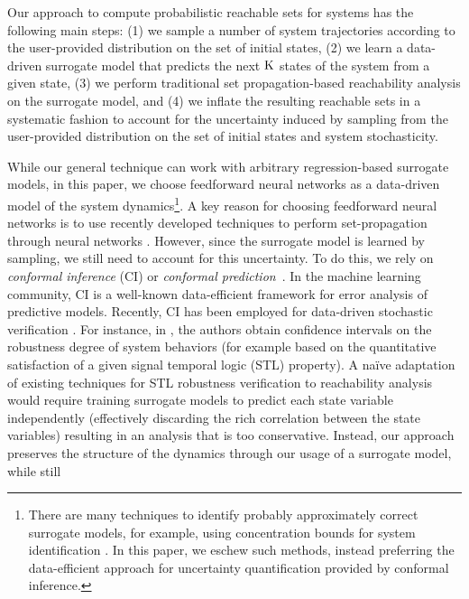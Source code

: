 Our approach to compute probabilistic reachable sets for  systems has 
the following main steps: (1) we sample a number of system trajectories according to the 
user-provided distribution on the set of initial states, (2) we learn a data-driven
surrogate model that predicts the next $\mathrm{K}$ states of the system from a given state, 
(3) we perform traditional set propagation-based reachability analysis on the surrogate model,
and (4) we inflate the resulting reachable sets in a systematic fashion to account for the 
uncertainty induced by sampling from the user-provided distribution on the set of initial states and system stochasticity. 

While our general technique can work with arbitrary regression-based surrogate models,
in this paper, we choose feedforward neural networks as a data-driven model of the system
dynamics\footnote{There are many techniques to identify probably approximately correct
surrogate models, for example, using concentration bounds for system identification
\cite{matni2019tutorial}. In this paper, we eschew such methods, instead preferring the
data-efficient approach for uncertainty quantification provided by conformal inference.}. A key reason for choosing feedforward neural networks is 
to use recently developed techniques to perform set-propagation 
through neural networks \cite{tran2020nnv}. However,
since the surrogate model is learned by sampling, we still need to account for this uncertainty. 
To do this, we rely on {\em conformal
inference} (CI) or {\em conformal prediction}~\cite{vovk2005algorithmic,lei2014distribution}. In the machine learning community, CI is a well-known data-efficient framework for error analysis 
of predictive models. Recently, CI has been employed for data-driven stochastic verification  \cite{bortolussi2019neural,cairoli2023conformal,lindemann2023conformal,qin2022statistical}. For 
instance, in \cite{cairoli2023conformal,qin2022statistical,lindemann2023conformal}, the authors obtain 
confidence intervals on the robustness degree of system behaviors (for example based on the quantitative 
satisfaction of a given signal temporal logic (STL) property). A na\"{i}ve adaptation of existing
techniques for STL robustness verification to reachability analysis would require training surrogate models 
to predict each state variable independently (effectively discarding the rich correlation between
the state variables) resulting in an analysis that is too conservative. Instead, our approach 
preserves the structure of the dynamics through our usage of a surrogate model, while still 

